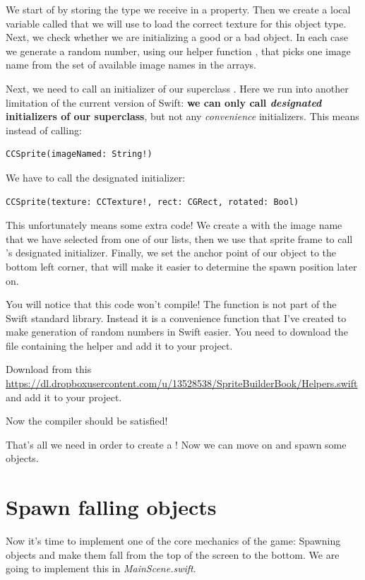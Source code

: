 We start of by storing the type we receive in a property.
Then we create a local variable called  that we will use
to load the correct texture for this object type. Next, we check whether we are
initializing a good or a bad object. In each case we generate a random number,
using our helper function , that picks one image name
from the set of available image names in the arrays. 

Next, we need to call an initializer of our superclass \ccsprite{}. Here we run
into another limitation of the current version of Swift: \textbf{we can only
call \textit{designated} initializers of our superclass}, but not any
\textit{convenience} initializers. This means instead of calling:
\begin{lstlisting}
CCSprite(imageNamed: String!)
\end{lstlisting}
We have to call the designated initializer:
\begin{lstlisting}
CCSprite(texture: CCTexture!, rect: CGRect, rotated: Bool)
\end{lstlisting}
This unfortunately means some extra code! We create a 
with the image name that we have selected from one of our lists, then we use
that sprite frame to call \ccsprite{}'s designated initializer. Finally, we set
the anchor point of our object to the bottom left corner, that will make it
easier to determine the spawn position later on.

You will notice that this code won't compile! The 
function is not part of the Swift standard library. Instead it is a convenience
function that I've created to make generation of random numbers in Swift easier.
You need to download the file containing the helper and add it to your project.

\begin{leftbar}
Download  from this
\url{https://dl.dropboxusercontent.com/u/13528538/SpriteBuilderBook/Helpers.swift}
and add it to your project.
\end{leftbar}

Now the compiler should be satisfied!

That's all we need in order to create a ! Now we
can move on and spawn some objects.

\section{Spawn falling objects}
Now it's time to implement one of the core mechanics of the game: Spawning
objects and make them fall from the top of the screen to the bottom. We are
going to implement this in \textit{MainScene.swift}. 

